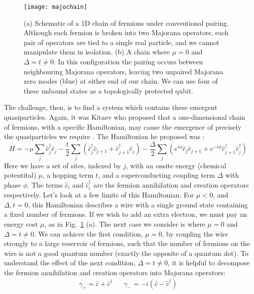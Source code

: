 \begin{figure}
  \texttt{[image: majochain]}
  \caption[1D chain of fermions, forming a Majorana zero modes]
  {\label{fig:majo}(a) Schematic of a 1D chain of fermions under conventional pairing. Although each fermion is broken into two
  Majorana operators, each pair of operators are tied to a single real particle, and we cannot manipulate them in isolation.
  (b) A chain where $\mu = 0$ and $\Delta = t \neq 0$. In this configuration the pairing occurs between neighbouring Majorana operators,
  leaving two unpaired Majorana zero modes (blue) at either end of our chain. We can use four of these unbound states as a
  topologically protected qubit.}
\end{figure}

The challenge, then, is to find a system which contains these emergent quasiparticles. Again, it was Kitaev who proposed that
a one-dimensional chain of fermions, with a specific Hamiltonian, may cause the emergence of precisely the quasiparticles we require \cite{Kitaev_2001}.
The Hamiltonian he proposed was \cite{Alicea_2012}:
\begin{equation}
  H = -\mu\sum_j \hat c_j^\dagger \hat c_j - \frac{t}{2}\sum_j\left(\hat c_j^\dagger \hat c_{j+1} + \hat c_{j+1}^\dagger \hat c_j\right)
      -\frac{\Delta}{2}\sum_j\left(e^{i\phi}\hat c_j\hat c_{j+1} + e^{-i\phi} \hat c_{j+1}^\dagger \hat c_j^\dagger\right)
  \label{eq:kith}
\end{equation}
Here we have a set of sites, indexed by $j$, with an onsite energy (chemical potentital) $\mu$, a hopping term $t$, and a superconducting coupling
term $\Delta$ with phase $\phi$. The terms $\hat c_i$ and $\hat c_i^\dagger$ are the fermion annihilation and creation operators respectively.
Let's look at a few limits of this Hamiltonian. For $\mu < 0$, and $\Delta, t = 0$, this Hamiltonian describes a wire with a single ground state containing a fixed
number of fermions. If we wish to add an extra electron, we must pay an energy cost $\mu$, as in Fig.~\ref{fig:majo} (a). The next case we consider is where $\mu=0$ and
$\Delta = t \neq 0$. We can achieve the first condition, $\mu = 0$, by coupling the wire strongly to a large reservoir of fermions, such that the number of
fermions on the wire is not a good quantum number (exactly the opposite of a quantum dot). To understand the effect of the next condition, $\Delta = t \neq 0$, it is
helpful to decompose the fermion annihilation and creation operators into Majorana operators:
\begin{align}
  \gamma_+ = \hat c + \hat c^\dagger && \gamma_- = -i(\hat c - \hat c^\dagger)
\end{align}
